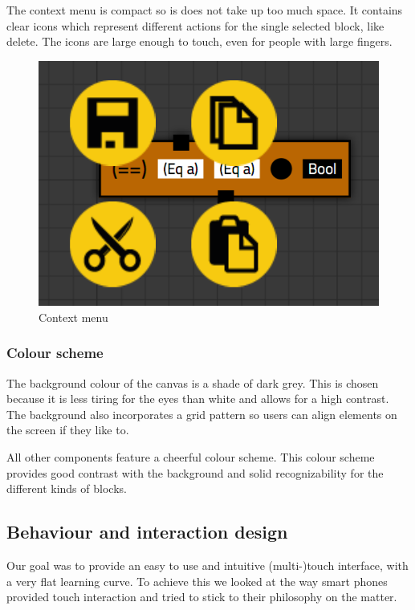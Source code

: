 The context menu is compact so is does not take up too much space. 
It contains clear icons which represent different actions for the single selected block, like delete.
The icons are large enough to touch, even for people with large fingers.

\begin{figure}[p]
	\centering
	\includegraphics[scale=0.5]{Images/blocks-menu}
	\caption{Context menu}
	\label{fig:blocks-menu}
\end{figure}

\subsubsection{Colour scheme}

The background colour of the canvas is a shade of dark grey.
This is chosen because it is less tiring for the eyes than white and allows for a high contrast.
The background also incorporates a grid pattern so users can align elements on the screen if they like to.

All other components feature a cheerful colour scheme.
This colour scheme provides good contrast with the background and solid recognizability for the different kinds of blocks.

\subsection{Behaviour and interaction design}

Our goal was to provide an easy to use and intuitive (multi-)touch interface, with a very flat learning curve. To achieve this we looked at the way smart phones provided touch interaction and tried to stick to their philosophy on the matter.

